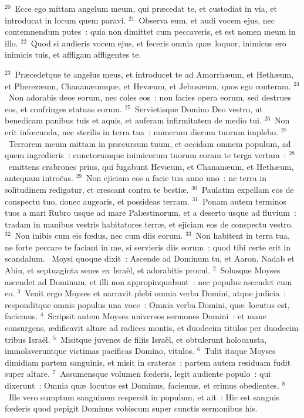 ${}^{20}$~Ecce ego mittam angelum meum, qui pr\ae cedat te, et custodiat in via, et introducat in locum quem paravi.
${}^{21}$~Observa eum, et audi vocem ejus, nec contemnendum putes~: quia non dimittet cum peccaveris, et est nomen meum in illo.
${}^{22}$~Quod si audieris vocem ejus, et feceris omnia qu\ae\ loquor, inimicus ero inimicis tuis, et affligam affligentes te.


${}^{23}$~Pr\ae cedetque te angelus meus, et introducet te ad Amorrh\ae um, et Heth\ae um, et Pherez\ae um, Chanan\ae umque, et Hev\ae um, et Jebus\ae um, quos ego conteram.
${}^{24}$~Non adorabis deos eorum, nec coles eos~: non facies opera eorum, sed destrues eos, et confringes statuas eorum.
${}^{25}$~Servietisque Domino Deo vestro, ut benedicam panibus tuis et aquis, et auferam infirmitatem de medio tui.
${}^{26}$~Non erit infœcunda, nec sterilis in terra tua~: numerum dierum tuorum implebo.
${}^{27}$~Terrorem meum mittam in pr\ae cursum tuum, et occidam omnem populum, ad quem ingredieris~: cunctorumque inimicorum tuorum coram te terga vertam~:
${}^{28}$~emittens crabrones prius, qui fugabunt Hev\ae um, et Chanan\ae um, et Heth\ae um, antequam intro\"eas.
${}^{29}$~Non ejiciam eos a facie tua anno uno~: ne terra in solitudinem redigatur, et crescant contra te besti\ae .
${}^{30}$~Paulatim expellam eos de conspectu tuo, donec augearis, et possideas terram.
${}^{31}$~Ponam autem terminos tuos a mari Rubro usque ad mare Pal\ae stinorum, et a deserto usque ad fluvium~: tradam in manibus vestris habitatores terr\ae , et ejiciam eos de conspectu vestro.
${}^{32}$~Non inibis cum eis fœdus, nec cum diis eorum.
${}^{33}$~Non habitent in terra tua, ne forte peccare te faciant in me, si servieris diis eorum~: quod tibi certe erit in scandalum.
~\lettrine[lines=10,image=true,loversize=0.05,lraise=-0.03]{M}{}oysi quoque dixit~: Ascende ad Dominum tu, et Aaron, Nadab et Abiu, et septuaginta senes ex Isra\"el, et adorabitis procul.
${}^{2}$~Solusque Moyses ascendet ad Dominum, et illi non appropinquabunt~: nec populus ascendet cum eo.
${}^{3}$~Venit ergo Moyses et narravit plebi omnia verba Domini, atque judicia~: responditque omnis populus una voce~: Omnia verba Domini, qu\ae\ locutus est, faciemus.
${}^{4}$~Scripsit autem Moyses universos sermones Domini~: et mane consurgens, \ae dificavit altare ad radices montis, et duodecim titulos per duodecim tribus Isra\"el.
${}^{5}$~Misitque juvenes de filiis Isra\"el, et obtulerunt holocausta, immolaveruntque victimas pacificas Domino, vitulos.
${}^{6}$~Tulit itaque Moyses dimidiam partem sanguinis, et misit in crateras~: partem autem residuam fudit super altare.
${}^{7}$~Assumensque volumen fœderis, legit audiente populo~: qui dixerunt~: Omnia qu\ae\ locutus est Dominus, faciemus, et erimus obedientes.
${}^{8}$~Ille vero sumptum sanguinem respersit in populum, et ait~: Hic est sanguis fœderis quod pepigit Dominus vobiscum super cunctis sermonibus his.


